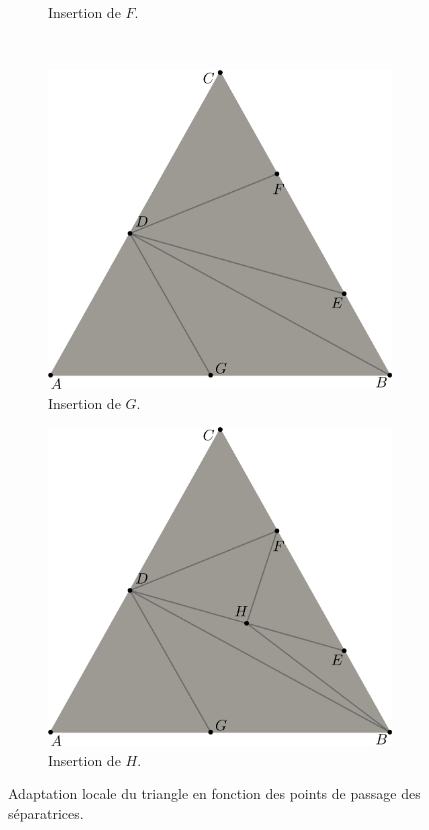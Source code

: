 \begin{figure}[h!]
\begin{subfigure}{0.45\textwidth}
    \caption{Insertion de $F$.}
    \label{fig:exemple_insert_pt_3}
\end{subfigure}
\\[0.5cm]
\begin{subfigure}{0.45\textwidth}
    \includegraphics[width=\textwidth]{images/decoup_triangle-4.pdf}
    \caption{Insertion de $G$.}
    \label{fig:exemple_insert_pt_4}
\end{subfigure}
\hfill
\begin{subfigure}{0.45\textwidth}
    \includegraphics[width=\textwidth]{images/decoup_triangle-5.pdf}
    \caption{Insertion de $H$.}
    \label{fig:exemple_insert_pt_5}
\end{subfigure}
\caption{Adaptation locale du triangle en fonction des points de passage des séparatrices.}
\label{fig:exemple_insert_pt}
\end{figure}

